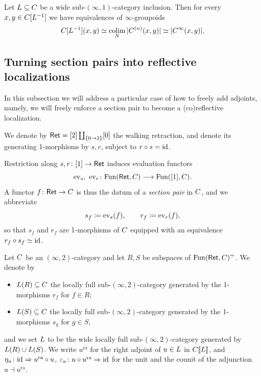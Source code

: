 \documentclass[a4paper,reqno,twoside]{amsart}
\begin{document}
\begin{corollary}\label{cor:dwyerkanhammock}
	Let $\relax{L} \subseteq \relax{C}$ be a wide sub-$(\infty,1)$-category inclusion. Then for every $x,y \in \relax{C}[\relax{L}^{-1}]$ we have equivalences of $\infty$-groupoids
	\[
		\relax{C}[\relax{L}^{-1}](x,y)\simeq  \operatorname*{colim}_{\relax{N}} |\relax{C}^{(n)}(x,y)| \simeq |\relax{C}^{\infty}(x,y)|.
	\]
\end{corollary}



\subsection{Turning section pairs into reflective localizations}
In this subsection we will address a particular case of how to freely add adjoints, namely, we will freely enforce a section pair to become a (co)reflective localization.


\begin{notation}\label{not:Ret}
	We denote by $\mathsf{Ret}= [2] \coprod_{\{0 \to 2\}} [0]$ the walking retraction, and denote its generating 1-morphisms by $s,r$, subject to $r \circ s =\mathrm{id}$.

	Restriction along $s,r \colon [1] \to \mathsf{Ret}$ induces evaluation functors
	\[
		\operatorname{ev}_s,\ \operatorname{ev}_r \colon \mathrm{Fun}(\mathsf{Ret},\relax{C}) \longrightarrow \mathrm{Fun}([1],\relax{C}).
	\]
	A functor $f \colon \mathsf{Ret} \to \relax{C}$ is thus the datum of a \emph{section pair} in $\relax{C}$, and we abbreviate
	\[
		s_f \coloneqq \operatorname{ev}_s(f), \qquad r_f \coloneqq \operatorname{ev}_r(f),
	\]
	so that $s_f$ and $r_f$ are 1-morphisms of $\relax{C}$ equipped with an equivalence $r_f \circ s_f \simeq \mathrm{id}$.
\end{notation}

\begin{definition}\label{def:marked-morphisms}
	Let $\relax{C}$ be an $(\infty,2)$-category and let $R,S$ be subspaces of $\mathrm{Fun}(\mathsf{Ret},\relax{C})^{\simeq}$. We denote by
	\begin{itemize}
		\item $\relax{L}(R) \subseteq \relax{C}$ the locally full sub-$(\infty,2)$-category generated by the 1-morphisms $r_f$ for $f \in R$;
		\item $\relax{L}(S) \subseteq \relax{C}$ the locally full sub-$(\infty,2)$-category generated by the 1-morphisms $s_g$ for $g \in S$,
	\end{itemize}
	and we set $\relax{L}$ to be the wide locally full sub-$(\infty,2)$-category generated by $\relax{L}(R) \cup \relax{L}(S)$. We write $u^{\mathrm{ra}}$ for the right adjoint of $u \in \relax{L}$ in $\relax{C}[\![\relax{L}]\!]$, and $\eta_u \colon \mathrm{id} \Rightarrow u^{\mathrm{ra}} \circ u$, $\varepsilon_u \colon u \circ u^{\mathrm{ra}} \Rightarrow \mathrm{id}$ for the unit and the counit of the adjunction $u \dashv u^{\mathrm{ra}}$.
\end{definition}
\end{document}
